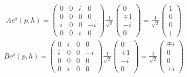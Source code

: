 \documentclass[11pt]{article}
\def\eps{\epsilon}
\begin{document}
\begin{eqnarray}
    && A \eps^\mu(p,h) = 
    \begin{pmatrix}
        0 & 0 & i & 0\\ 
        0 & 0 & 0 & 0 \\
        i & 0 & 0 & -i \\
        0 & 0 & i & 0
    \end{pmatrix} 
    \frac{1}{\sqrt 2}
    \begin{pmatrix}
        0 \\ \mp 1 \\ -i \\ 0
    \end{pmatrix}
    =
    \frac{1}{\sqrt 2}
    \begin{pmatrix}
        1 \\ 0 \\ 0 \\ 1
    \end{pmatrix}
\end{eqnarray}
\begin{eqnarray}
    && B \eps^\mu(p,h) = 
    \begin{pmatrix}
        0 & i & 0 & 0 \\
        i & 0 & 0 & -i \\
        0 & 0 & 0 & 0 \\
        0 & i & 0 & 0 
    \end{pmatrix}
    \frac{1}{\sqrt 2}
    \begin{pmatrix}
        0 \\ \mp 1 \\ -i \\ 0
    \end{pmatrix}
    =
    \frac{1}{\sqrt 2}
    \begin{pmatrix}
        \mp i \\ 0 \\ 0 \\ \mp i
    \end{pmatrix}
\end{eqnarray}
\end{document}
